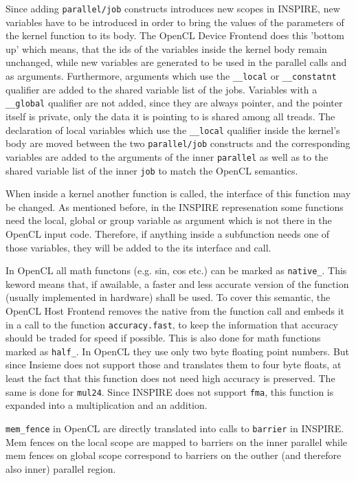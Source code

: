 Since adding \texttt{parallel/job} constructs introduces new scopes in INSPIRE, new variables have to be introduced in order to bring the values of the parameters of the kernel function to its body. The OpenCL Device Frontend does this 'bottom up' which means, that the ids of the variables inside the kernel body remain unchanged, while new variables are generated to be used in the parallel calls and as arguments. Furthermore, arguments which use the \texttt{\_\_local} or \texttt{\_\_constatnt} qualifier are added to the shared variable list of the jobs. Variables with a \texttt{\_\_global} qualifier are not added, since they are always pointer, and the pointer itself is private, only the data it is pointing to is shared among all treads. The declaration of local variables which use the \texttt{\_\_local} qualifier inside the kernel's body are moved between the two \texttt{parallel/job} constructs and the corresponding variables are added to the arguments of the inner \texttt{parallel} as well as to the shared variable list of the inner \texttt{job} to match the OpenCL semantics. 

When inside a kernel another function is called, the interface of this function may be changed. As mentioned before, in the INSPIRE represenation some functions need the local, global or group variable as argument which is not there in the OpenCL input code. Therefore, if anything inside a subfunction needs one of those variables, they will be added to the its interface and call.

In OpenCL all math functons (e.g. sin, cos etc.) can be marked as \texttt{native\_}. This keword means that, if awailable, a faster and less accurate version of the function (usually implemented in hardware) shall be used. To cover this semantic, the OpenCL Host Frontend removes the native from the function call and embeds it in a call to the function \texttt{accuracy.fast}, to keep the information that accuracy should be traded for speed if possible. This is also done for math functions marked as \texttt{half\_}. In OpenCL they use only two byte floating point numbers. But since Insieme does not support those and translates them to four byte floats, at least the fact that this function does not need high accuracy is preserved. The same is done for \texttt{mul24}. Since INSPIRE does not support \texttt{fma}, this function is expanded into a multiplication and an addition.

\texttt{mem\_fence} in OpenCL are directly translated into calls to \texttt{barrier} in INSPIRE. Mem fences on the local scope are mapped to barriers on the inner parallel while mem fences on global scope correspond to barriers on the outher (and therefore also inner) parallel region.

